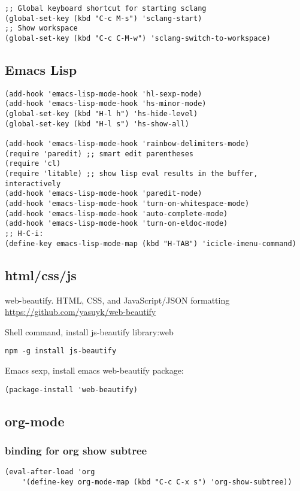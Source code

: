 \documentclass{article}
\begin{document}
\begin{verbatim}
;; Global keyboard shortcut for starting sclang
(global-set-key (kbd "C-c M-s") 'sclang-start)
;; Show workspace
(global-set-key (kbd "C-c C-M-w") 'sclang-switch-to-workspace)
\end{verbatim}
\subsection{Emacs Lisp}
\label{sec-2-3}
\begin{verbatim}
(add-hook 'emacs-lisp-mode-hook 'hl-sexp-mode)
(add-hook 'emacs-lisp-mode-hook 'hs-minor-mode)
(global-set-key (kbd "H-l h") 'hs-hide-level)
(global-set-key (kbd "H-l s") 'hs-show-all)

(add-hook 'emacs-lisp-mode-hook 'rainbow-delimiters-mode)
(require 'paredit) ;; smart edit parentheses
(require 'cl)
(require 'litable) ;; show lisp eval results in the buffer, interactively
(add-hook 'emacs-lisp-mode-hook 'paredit-mode)
(add-hook 'emacs-lisp-mode-hook 'turn-on-whitespace-mode)
(add-hook 'emacs-lisp-mode-hook 'auto-complete-mode)
(add-hook 'emacs-lisp-mode-hook 'turn-on-eldoc-mode)
;; H-C-i:
(define-key emacs-lisp-mode-map (kbd "H-TAB") 'icicle-imenu-command)
\end{verbatim}
\subsection{html/css/js}
\label{sec-2-4}
web-beautify.
HTML, CSS, and JavaScript/JSON formatting
\url{https://github.com/yasuyk/web-beautify}

Shell command, install js-beautify library:web
\begin{verbatim}
npm -g install js-beautify
\end{verbatim}
Emacs sexp, install emacs web-beautify package:
\begin{verbatim}
(package-install 'web-beautify)
\end{verbatim}

\subsection{org-mode}
\label{sec-2-5}
\subsubsection{binding for org show subtree}
\label{sec-2-5-1}

\begin{verbatim}
(eval-after-load 'org
    '(define-key org-mode-map (kbd "C-c C-x s") 'org-show-subtree))
\end{verbatim}
\end{document}
